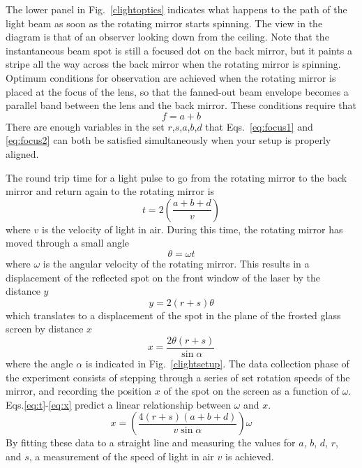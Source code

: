 \documentclass{revtex4}
\begin{document}
The lower panel in Fig.~\ref{clightoptics} indicates what happens to the
path of the light beam as soon as the rotating mirror starts spinning.
The view in the diagram is that of an observer looking down from the ceiling.
Note that the instantaneous beam spot is still a focused dot on the back
mirror, but it paints a stripe all the way across the back mirror when the
rotating mirror is spinning.  Optimum conditions for observation are achieved
when the rotating mirror is placed at the focus of the lens, so that the
fanned-out beam envelope becomes a parallel band between the lens and the
back mirror.  These conditions require that
\begin{equation}
f = a+b
\label{eq:focus2}
\end{equation}
There are enough variables in the set $r$,$s$,$a$,$b$,$d$ that
Eqs.~\ref{eq:focus1} and \ref{eq:focus2} can both be satisfied simultaneously
when your setup is properly aligned.

The round trip time for a light pulse to go from the rotating mirror to the
back mirror and return again to the rotating mirror is
\begin{equation}
t = 2\left(\frac{a+b+d}{v}\right)
\label{eq:t}
\end{equation}
where $v$ is the velocity of light in air. During this time, the rotating
mirror has moved through a small angle
\begin{equation}
\theta = \omega t
\label{eq:theta}
\end{equation}
where $\omega$ is the angular velocity of the rotating mirror. This results
in a displacement of the reflected spot on the front window of the laser by
the distance $y$
\begin{equation}
y=2(r+s)\theta
\label{eq:y}
\end{equation}
which translates to a displacement of the spot in the plane of the frosted
glass screen by distance $x$
\begin{equation}
x=\frac{2\theta(r+s)}{\sin{\alpha}}
\label{eq:x}
\end{equation}
where the angle $\alpha$ is indicated in Fig.~\ref{clightsetup}.
The data collection phase of the experiment consists of stepping through a
series of set rotation speeds of the mirror, and recording the position $x$
of the spot on the screen as a function of $\omega$.  Eqs.\ref{eq:t}-\ref{eq:x}
predict a linear relationship between $\omega$ and $x$.
\begin{equation}
x=\left(\frac{4(r+s)(a+b+d)}{v\sin{\alpha}}\right)\omega
\end{equation}
By fitting these data to a straight line and measuring the values for
$a$, $b$, $d$, $r$, and $s$, a measurement of the speed of light in air $v$
is achieved.
\end{document}
